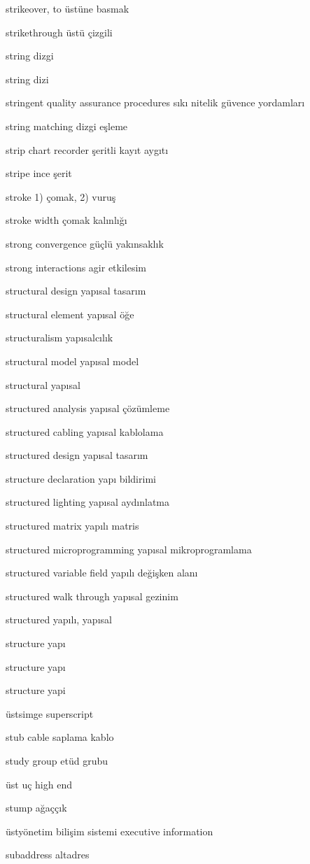 \documentclass[12pt,fleqn]{article}\usepackage{../../common}
\begin{document}
strikeover, to üstüne basmak

strikethrough üstü çizgili

string dizgi

string dizi

stringent quality assurance procedures sıkı nitelik güvence yordamları

string matching dizgi eşleme

strip chart recorder şeritli kayıt aygıtı

stripe ince şerit

stroke 1) çomak, 2) vuruş

stroke width çomak kalınlığı

strong convergence güçlü yakınsaklık

strong interactions agir etkilesim

structural design yapısal tasarım

structural element yapısal öğe

structuralism yapısalcılık

structural model yapısal model

structural yapısal

structured analysis yapısal çözümleme

structured cabling yapısal kablolama

structured design yapısal tasarım

structure declaration yapı bildirimi

structured lighting yapısal aydınlatma

structured matrix yapılı matris

structured microprogramming yapısal mikroprogramlama

structured variable field yapılı değişken alanı

structured walk through yapısal gezinim

structured yapılı, yapısal

structure yapı

structure yapı

structure yapi

üstsimge superscript

stub cable saplama kablo

study group etüd grubu

üst uç high end

stump ağaççık

üstyönetim bilişim sistemi executive information

subaddress altadres
\end{document}
